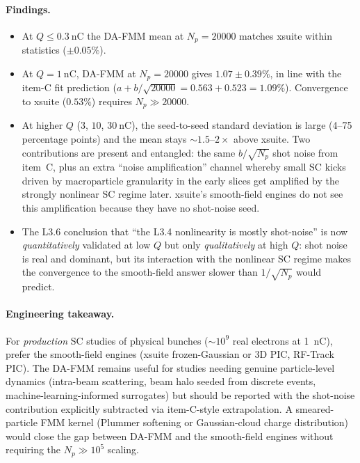 \documentclass[11pt]{article}
\begin{document}
\paragraph{Findings.}
\begin{itemize}
\item At $Q \leq \SI{0.3}{\nano\coulomb}$ the DA-FMM mean at $N_p=20000$
      matches xsuite within statistics ($\pm 0.05\%$).
\item At $Q=\SI{1}{\nano\coulomb}$, DA-FMM at $N_p=20000$ gives
      $1.07 \pm 0.39\%$, in line with the item-C fit prediction
      ($a + b/\sqrt{20000} = 0.563 + 0.523 = 1.09\%$). Convergence to
      xsuite ($0.53\%$) requires $N_p \gg 20000$.
\item At higher $Q$ ($3$, $10$, $30~\mathrm{nC}$), the seed-to-seed
      standard deviation is large (4--75 percentage points) and the
      mean stays $\sim 1.5$--$2\times$ above xsuite. Two contributions
      are present and entangled: the same $b/\sqrt{N_p}$ shot noise
      from item~C, plus an extra ``noise amplification'' channel
      whereby small SC kicks driven by macroparticle granularity in
      the early slices get amplified by the strongly nonlinear SC
      regime later. xsuite's smooth-field engines do not see this
      amplification because they have no shot-noise seed.
\item The L3.6 conclusion that ``the L3.4 nonlinearity is mostly
      shot-noise'' is now \emph{quantitatively} validated at low $Q$
      but only \emph{qualitatively} at high $Q$: shot noise is real
      and dominant, but its interaction with the nonlinear SC regime
      makes the convergence to the smooth-field answer slower than
      $1/\sqrt{N_p}$ would predict.
\end{itemize}

\paragraph{Engineering takeaway.}
For \emph{production} SC studies of physical bunches ($\sim 10^9$ real
electrons at \SI{1}{\nano\coulomb}), prefer the smooth-field engines
(xsuite frozen-Gaussian or 3D PIC, RF-Track PIC). The DA-FMM remains
useful for studies needing genuine particle-level dynamics
(intra-beam scattering, beam halo seeded from discrete events,
machine-learning-informed surrogates) but should be reported with the
shot-noise contribution explicitly subtracted via item-C-style
extrapolation. A smeared-particle FMM kernel (Plummer softening or
Gaussian-cloud charge distribution) would close the gap between
DA-FMM and the smooth-field engines without requiring the
$N_p \gg 10^5$ scaling.
\end{document}
